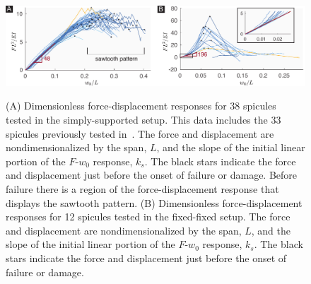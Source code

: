 

\begin{figure}[H]
\centering
\includegraphics[width=\textwidth]{Figures/NormalizedFw0Curves3_V4.pdf}\\
\vspace{1cm}
\caption{(\textsf{A}) Dimensionless force-displacement responses for 38 \EA spicules tested in the simply-supported setup. This data includes the 33 \EA spicules previously tested in~\cite{monn2017enhanced}. The force and displacement are nondimensionalized by the span, $L$, and the slope of the initial linear portion of the $F$-$w_0$ response, $k_s$. The black stars indicate the force and displacement just before the onset of failure or damage. Before failure there is a region of the force-displacement response that displays the sawtooth pattern.
(\textsf{B}) Dimensionless force-displacement responses for 12 \EA spicules tested in the fixed-fixed setup. The force and displacement are nondimensionalized by the span, $L$, and the slope of the initial linear portion of the $F$-$w_0$ response, $k_s$. The black stars indicate the force and displacement just before the onset of failure or damage.
}
\label{fig:DimensionlessFw0}
\end{figure}
